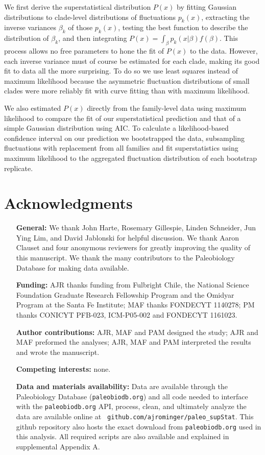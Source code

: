 \documentclass[12pt]{article}
\begin{document}
We first derive the superstatistical distribution $P(x)$ by fitting
Gaussian distributions to clade-level distributions of fluctuations
$p_k(x)$, extracting the inverse variances $\beta_k$ of those
$p_k(x)$, testing the best function to describe the distribution of
$\beta_k$, and then integrating
$P(x) = \int_{\beta}p_k(x | \beta) f(\beta)$. This process allows no
free parameters to hone the fit of $P(x)$ to the data.  However, each
inverse variance must of course be estimated for each clade, making
its good fit to data all the more surprising.  To do so we use least
squares instead of maximum likelihood because the asymmetric
fluctuation distributions of small clades were more reliably fit with
curve fitting than with maximum likelihood.

We also estimated $P(x)$ directly from the family-level data using
maximum likelihood to compare the fit of our superstatistical
prediction and that of a simple Gaussian distribution using AIC. To
calculate a likelihood-based confidence interval on our prediction we
bootstrapped the data, subsampling fluctuations with replacement from
all families and fit superstatistics using maximum likelihood to the
aggregated fluctuation distribution of each bootstrap replicate.





\section*{Acknowledgments}
\begin{itemize}
\item[{\bf General:}] We thank John Harte, Rosemary Gillespie, Linden
  Schneider, Jun Ying Lim, and David Jablonski for helpful
  discussion. We thank Aaron Clauset and four anonymous reviewers for
  greatly improving the quality of this manuscript. We thank the many
  contributors to the Paleobiology Database for making data available.
\item[{\bf Funding:}] AJR thanks funding from Fulbright Chile, the
  National Science Foundation Graduate Research Fellowship Program and
  the Omidyar Program at the Santa Fe Institute; MAF thanks FONDECYT
  1140278; PM thanks CONICYT PFB-023, ICM-P05-002 and FONDECYT
  1161023.
\item[{\bf Author contributions:}] AJR, MAF and PAM designed the
  study; AJR and MAF preformed the analyses; AJR, MAF and PAM
  interpreted the results and wrote the manuscript.
\item[{\bf Competing interests:}] none.
\item[{\bf Data and materials availability:}] Data are available
  through the Paleobiology Database ({\tt paleobiodb.org}) and all
  code needed to interface with the {\tt paleobiodb.org} API, process,
  clean, and ultimately analyze the data are available online at {\tt
    github.com/ajrominger/paleo\_supStat}. This github repository also
  hosts the exact download from {\tt paleobiodb.org} used in this
  analysis. All required scripts are also available and explained in
  supplemental Appendix A.
\end{itemize}
\end{document}
